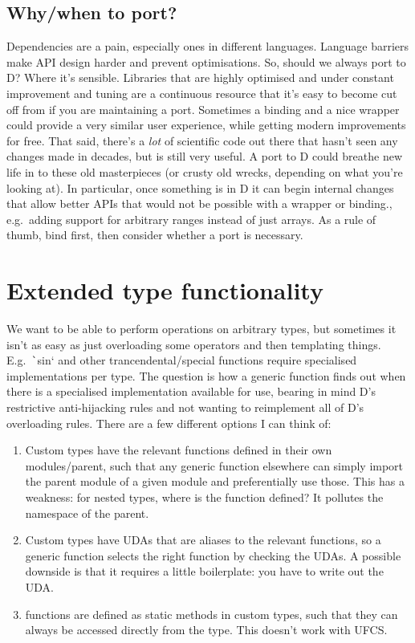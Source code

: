 \documentclass[10pt,a5paper,DIV=13]{scrartcl}
\begin{document}
\subsection{Why/when to port?}
Dependencies are a pain, especially ones in different languages. Language barriers make API design harder and prevent optimisations. So, should we always port to D? Where it's sensible. Libraries that are highly optimised and under constant improvement and tuning are a continuous resource that it's easy to become cut off from if you are maintaining a port. Sometimes a binding and a nice wrapper could provide a very similar user experience, while getting modern improvements for free. That said, there's a \emph{lot} of scientific code out there that hasn't seen any changes made in decades, but is still very useful. A port to D could breathe new life in to these old masterpieces (or crusty old wrecks, depending on what you're looking at). In particular, once something is in D it can begin internal changes that allow better APIs that would not be possible with a wrapper or binding., e.g.\ adding support for arbitrary ranges instead of just arrays. As a rule of thumb, bind first, then consider whether a port is necessary.

\section{Extended type functionality}
We want to be able to perform operations on arbitrary types, but sometimes it isn't as easy as just overloading some operators and then templating things. E.g.\ \texttt`sin` and other trancendental/special functions require specialised implementations per type. The question is how a generic function finds out when there is a specialised implementation available for use, bearing in mind D's restrictive anti-hijacking rules and not wanting to reimplement all of D's overloading rules. There are a few different options I can think of:
\begin{enumerate}
    \item Custom types have the relevant functions defined in their own modules/parent, such that any generic function elsewhere can simply import the parent module of a given module and preferentially use those. This has a weakness: for nested types, where is the function defined? It pollutes the namespace of the parent.
    \item Custom types have UDAs that are aliases to the relevant functions, so a generic function selects the right function by checking the UDAs. A possible downside is that it requires a little boilerplate: you have to write out the UDA.\label{UDAs}
    \item functions are defined as static methods in custom types, such that they can always be accessed directly from the type. This doesn't work with UFCS.
\end{enumerate}
\end{document}
